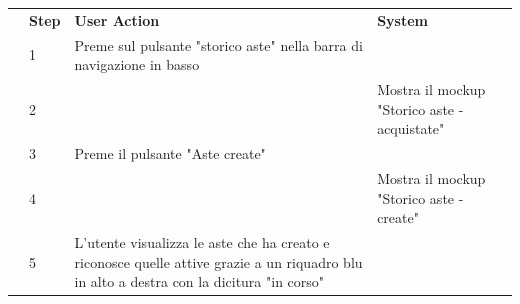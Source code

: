 \begin{table}[H]
\begin{tabularx}{\linewidth}{|p{135pt}|p{25pt}|>{\raggedright\arraybackslash}X|>{\raggedright\arraybackslash}X|}
		\hline \rowcolor[HTML]{DCDCDC}
		\multirow{1}{*}{}{\textbf{\sffamily Description}}             & \textbf{\sffamily Step}                                                                                                                                              & \textbf{\sffamily User Action}                                                                                                           & \textbf{\sffamily System}                               \\
		\cline{2-4}                                                   & 1                                                                                                                                                                    & Preme sul pulsante "storico aste" nella barra di navigazione in basso                                                                    &                                                         \\
		\cline{2-4}                                                   & 2                                                                                                                                                                    &                                                                                                                                          & Mostra il mockup "Storico aste - acquistate"            \\
		\cline{2-4}                                                   & 3                                                                                                                                                                    & Preme il pulsante "Aste create"                                                                                                          &                                                         \\
		\cline{2-4}                                                   & 4                                                                                                                                                                    &                                                                                                                                          & Mostra il mockup "Storico aste - create"                \\
		\cline{2-4}                                                   & 5                                                                                                                                                                    & L'utente visualizza le aste che ha creato e riconosce quelle attive grazie a un riquadro blu in alto a destra con la dicitura "in corso" &                                                         \\


\end{tabularx}
\end{table}
